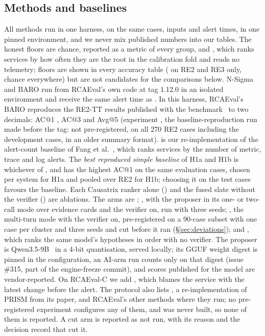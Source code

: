 \subsection{Methods and baselines}
\label{sec:baselines}

All methods run in one harness, on the same cases, inputs and alert times, in one pinned environment, and we never mix published numbers into our tables.
The honest floors are chance, reported as a metric of every group, and , which ranks services by how often they are the root in the calibration fold and reads no telemetry; floors are shown in every accuracy table ( on RE2 and RE3 only, chance everywhere) but are not candidates for the comparisons below.
N-Sigma and BARO run from RCAEval's own code at tag 1.12.0 in an isolated environment and receive the same alert time as \sys.
In this harness, RCAEval's BARO reproduces the RE2-TT results published with the benchmark~\cite{rcaeval2024} to two decimals: AC@1 , AC@3  and Avg@5  (experiment \allowbreak{}, the baseline-reproduction run made before the tag: not pre-registered, on all 270 RE2 cases including the development cases, in an older summary format).
 is our re-implementation of the alert-count baseline of Fang et al.~\cite{fang2026rethinking}, which ranks services by the number of metric, trace and log alerts.
The \emph{best reproduced simple baseline} of H1a and H1b is whichever of ,  and  has the highest AC@1 on the same evaluation cases, chosen per system for H1a and pooled over RE2 for H1b; choosing it on the test cases favours the baseline.
Each Causatrix ranker alone () and the fused slate without the verifier () are ablations.
The \sys arms are ; , with the proposer in its one- or two-call mode over evidence cards and the verifier on, run with three seeds; \allowbreak{}, the multi-turn mode with the verifier on, pre-registered on a 90-case subset with one case per cluster and three seeds and cut before it ran (\S\ref{sec:deviations}); and , which ranks the same model's hypotheses in order with no verifier.
The proposer is Qwen3.5-9B~\cite{qwen35card} in a 4-bit quantisation, served locally; its GGUF weight digest is pinned in the configuration, an AI-arm run counts only on that digest (issue \#315, part of the engine-freeze commit), and scores published for the model are vendor-reported.
On RCAEval-C we add , which blames the service with the latest change before the alert.
The protocol also lists , a re-implementation of PRISM from its paper, and RCAEval's other methods where they run; no pre-registered experiment configures any of them, and  was never built, so none of them is reported.
A cut arm is reported as not run, with its reason and the decision record that cut it.

